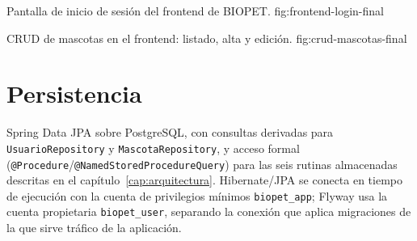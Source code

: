%
{Pantalla de inicio de sesi\'on del frontend de BIOPET.}%
{fig:frontend-login-final}

%
{CRUD de mascotas en el frontend: listado, alta y edici\'on.}%
{fig:crud-mascotas-final}

\section{Persistencia}

Spring Data JPA sobre PostgreSQL, con consultas derivadas para
\texttt{UsuarioRepository} y \texttt{MascotaRepository}, y acceso formal
(\texttt{@Procedure}/\texttt{@NamedStoredProcedureQuery}) para las seis
rutinas almacenadas descritas en el cap\'itulo~\ref{cap:arquitectura}.
Hibernate/JPA se conecta en tiempo de ejecuci\'on con la cuenta de
privilegios m\'inimos \texttt{biopet\_app}; Flyway usa la cuenta propietaria
\texttt{biopet\_user}, separando la conexi\'on que aplica migraciones de la
que sirve tr\'afico de la aplicaci\'on.
